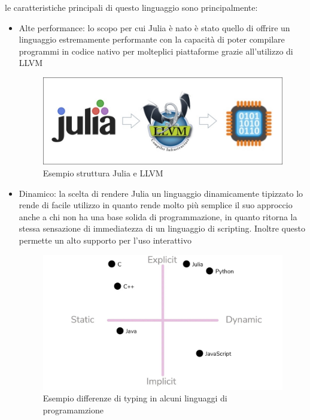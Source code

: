 le caratteristiche principali di questo linguaggio sono 
principalmente:
\begin{itemize}
    \item Alte performance: lo scopo per cui Julia è nato è 
    stato quello di offrire un linguaggio estremamente 
    performante con la capacità di poter compilare programmi 
    in codice nativo per molteplici piattaforme grazie 
    all’utilizzo di LLVM

    \begin{figure}
        \includegraphics[width=\linewidth]{img/julia_llvm.jpg}
        \caption{Esempio struttura Julia e LLVM}
        \label{fig:Julia_LLVM}
    \end{figure}

    \item Dinamico: la scelta di rendere Julia un linguaggio 
    dinamicamente tipizzato lo rende di facile utilizzo in 
    quanto rende molto più semplice il suo approccio anche a 
    chi non ha una base solida di programmazione, in quanto 
    ritorna la stessa sensazione di immediatezza di un 
    linguaggio di scripting. Inoltre questo permette un alto 
    supporto per l’uso interattivo

    \begin{figure}
        \includegraphics[width=\linewidth]{img/typing_example.jpg}
        \caption{Esempio differenze di typing in alcuni linguaggi di programamzione}
        \label{fig:Different_typing}
    \end{figure}


\end{itemize}

